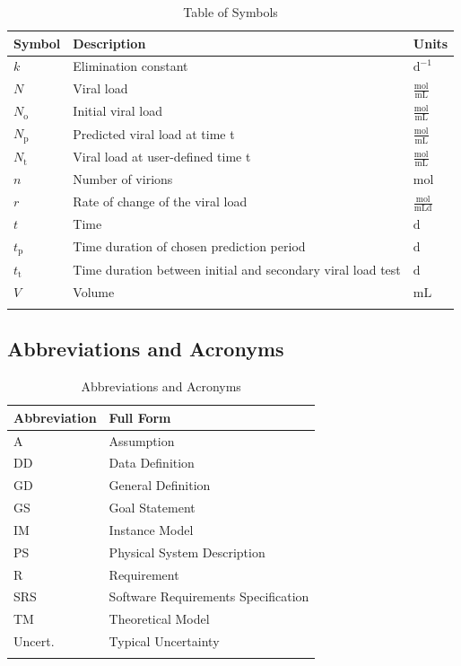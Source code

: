 \documentclass[12pt]{article}
\begin{document}
\begin{longtabu}{l X[l] l}
\toprule
\textbf{Symbol} & \textbf{Description} & \textbf{Units}
\\
\midrule
\endhead
$k$ & Elimination constant & $\text{d}^{-1}$
\\
$N$ & Viral load & $\frac{\text{mol}}{\text{mL}}$
\\
${N_{\text{o}}}$ & Initial viral load & $\frac{\text{mol}}{\text{mL}}$
\\
${N_{\text{p}}}$ & Predicted viral load at time t & $\frac{\text{mol}}{\text{mL}}$
\\
${N_{\text{t}}}$ & Viral load at user-defined time t & $\frac{\text{mol}}{\text{mL}}$
\\
$n$ & Number of virions & ${\text{mol}}$
\\
$r$ & Rate of change of the viral load & $\frac{\text{mol}}{\text{mL}\text{d}}$
\\
$t$ & Time & ${\text{d}}$
\\
${t_{\text{p}}}$ & Time duration of chosen prediction period & ${\text{d}}$
\\
${t_{\text{t}}}$ & Time duration between initial and secondary viral load test & ${\text{d}}$
\\
$V$ & Volume & ${\text{mL}}$
\\
\bottomrule
\caption{Table of Symbols}
\label{Table:ToS}
\end{longtabu}
\subsection{Abbreviations and Acronyms}
\label{Sec:TAbbAcc}
\begin{longtable}{l l}
\toprule
\textbf{Abbreviation} & \textbf{Full Form}
\\
\midrule
\endhead
A & Assumption
\\
DD & Data Definition
\\
GD & General Definition
\\
GS & Goal Statement
\\
IM & Instance Model
\\
PS & Physical System Description
\\
R & Requirement
\\
SRS & Software Requirements Specification
\\
TM & Theoretical Model
\\
Uncert. & Typical Uncertainty
\\
\bottomrule
\caption{Abbreviations and Acronyms}
\label{Table:TAbbAcc}
\end{longtable}
\end{document}
